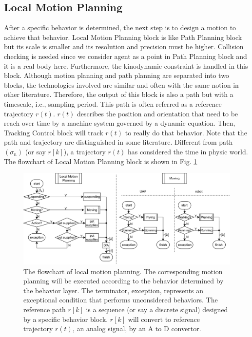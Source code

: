 \documentclass{ieeeaccess}
\begin{document}
\subsection{Local Motion Planning}
After a specific behavior is determined, the next step is to design a motion to achieve that behavior. Local Motion Planning block is like Path Planning block but its scale is smaller and its resolution and precision must be higher. Collision checking is needed since we consider agent as a point in Path Planning block and it is a real body here. Furthermore, the kinodynamic constraint is handled in this block. Although motion planning and path planning are separated into two blocks, the technologies involved are similar and often with the same notion in other literature. Therefore, the output of this block is also a path but with a timescale, i.e., sampling period. This path is often referred as a reference trajectory $r(t)$. $r(t)$ describes the position and orientation that need to be reach over time by a machine system governed by a dynamic equation. Then, Tracking Control block will track $r(t)$ to really do that behavior. Note that the path and trajectory are distinguished in some literature. Different from path $(\sigma_n)$ (or say $r[k]$), a trajectory $r(t)$ has considered the time in physic world. The flowchart of Local Motion Planning block is shown in Fig. \ref{fig:LocalMotionPlanning}
\begin{figure}[htbp]
    \centering
    \includegraphics[scale=.4]{fig/LMP.pdf}\caption{The flowchart of local motion planning. The corresponding motion planning will be executed according to the behavior determined by the behavior layer. The terminator, exception, represents an exceptional condition that performs unconsidered behaviors. The reference path $r[k]$ is a sequence (or say a discrete signal) designed by a specific behavior block. $r[k]$ will convert to reference trajectory $r(t)$, an analog signal, by an A to D convertor.}
    \label{fig:LocalMotionPlanning}
\end{figure}
\end{document}
